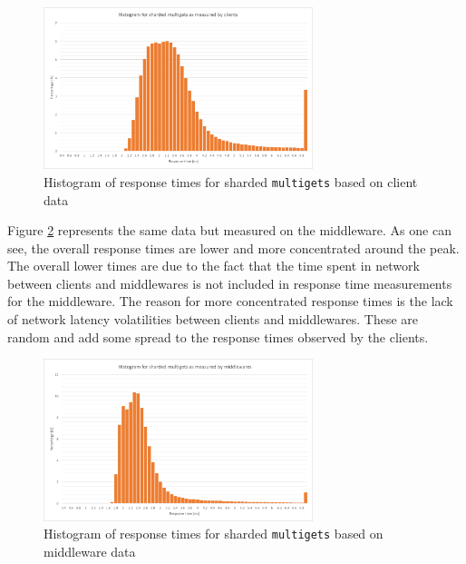 \documentclass[11pt,a4paper]{article}
\begin{document}
\begin{figure}[!h]
    \centering
    \includegraphics[width=0.7\textwidth]{processing/graphics/get_and_multigets_hist_sharded_clients.png}
    \caption{Histogram of response times for sharded \texttt{multigets} based on client data}
    \label{png::get_and_multigets_hist_sharded_clients}
\end{figure}

Figure \ref{png::get_and_multigets_hist_sharded_mws} represents the same data but measured on the middleware. As one can see, the overall response times are lower and more concentrated around the peak. The overall lower times are due to the fact that the time spent in network between clients and middlewares is not included in response time measurements for the middleware. The reason for more concentrated response times is the lack of network latency volatilities between clients and middlewares. These are random and add some spread to the response times observed by the clients.

\begin{figure}[!h]
    \centering
    \includegraphics[width=0.7\textwidth]{processing/graphics/get_and_multigets_hist_sharded_mws.png}
    \caption{Histogram of response times for sharded \texttt{multigets} based on middleware data}
    \label{png::get_and_multigets_hist_sharded_mws}
\end{figure}
\end{document}
